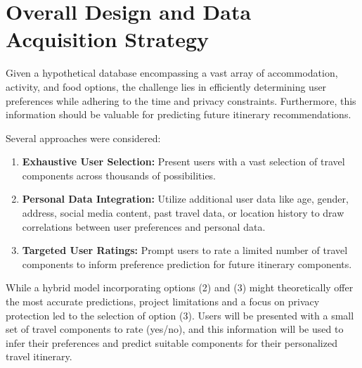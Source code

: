 \documentclass[12pt,a4paper]{report}
\begin{document}
\section{Overall Design and Data Acquisition Strategy}

Given a hypothetical database encompassing a vast array of accommodation, activity, and food options, the challenge lies in efficiently determining user preferences while adhering to the time and privacy constraints.  Furthermore, this information should be valuable for predicting future itinerary recommendations.

Several approaches were considered:

\begin{enumerate}
\item{\textbf{Exhaustive User Selection:} Present users with a vast selection of travel components across thousands of possibilities.
}
\item{\textbf{Personal Data Integration:} Utilize additional user data like age, gender, address, social media content, past travel data, or location history to draw correlations between user preferences and personal data.
}
\item{\textbf{Targeted User Ratings:} Prompt users to rate a limited number of travel components to inform preference prediction for future itinerary components.
}
\end{enumerate}

While a hybrid model incorporating options (2) and (3) might theoretically offer the most accurate predictions, project limitations and a focus on privacy protection led to the selection of option (3).  Users will be presented with a small set of travel components to rate (yes/no), and this information will be used to infer their preferences and predict suitable components for their personalized travel itinerary.
\end{document}
